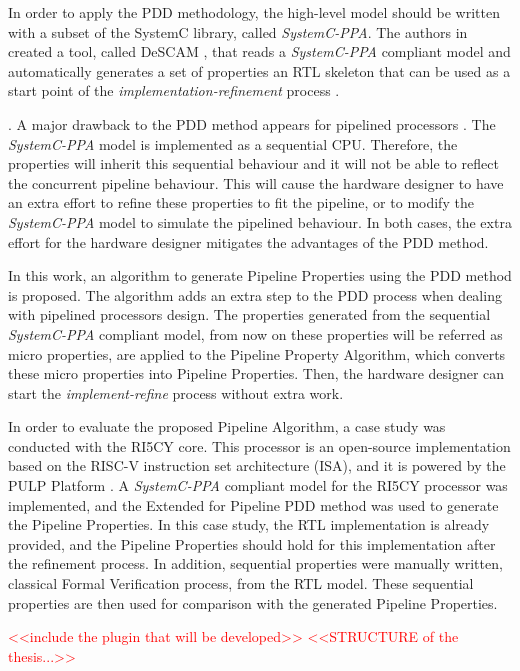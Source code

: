 In order to apply the PDD methodology, the high-level model should be written with a subset of the SystemC \cite{systemC} library, called \textit{SystemC-PPA}. The authors in \cite{paper-pdd} created a tool, called DeSCAM \cite{descam}, that reads a \textit{SystemC-PPA} compliant model and automatically generates a set of properties an RTL skeleton that can be used as a start point of the \textit{implementation-refinement} process .

. A major drawback to the PDD method appears for pipelined processors . The \textit{SystemC-PPA} model is implemented as a sequential CPU. Therefore, the properties will inherit this sequential behaviour and it will not be able to reflect the concurrent pipeline behaviour. This will cause the hardware designer to have an extra effort to refine these properties to fit the pipeline, or to modify the \textit{SystemC-PPA} model to simulate the pipelined behaviour. In both cases, the extra effort for the hardware designer mitigates the advantages of the PDD method.

In this work, an algorithm to generate Pipeline Properties using the PDD method is proposed. The algorithm adds an extra step to the PDD process when dealing with pipelined processors design. The properties generated from the sequential \textit{SystemC-PPA} compliant model, from now on these properties will be referred as micro properties, are applied to the Pipeline Property Algorithm, which converts these micro properties into Pipeline Properties. Then, the hardware designer can start the \textit{implement-refine} process without extra work.

In order to evaluate the proposed Pipeline Algorithm, a case study was conducted with the RI5CY  core. This processor is an open-source implementation based on the RISC-V instruction set architecture (ISA), and it is powered by the PULP Platform \cite{pulp}. A \textit{SystemC-PPA} compliant model for the RI5CY processor was implemented, and the Extended for Pipeline PDD method was used to generate the Pipeline Properties. In this case study, the RTL implementation is already provided, and the Pipeline Properties should hold for this implementation after the refinement process. In addition, sequential properties were manually written, classical Formal Verification process, from the RTL model. These sequential properties are then used for comparison with the generated Pipeline Properties. 

\textcolor{red}{<<include the plugin that will be developed>>}
\textcolor{red}{<<STRUCTURE of the thesis...>>}

